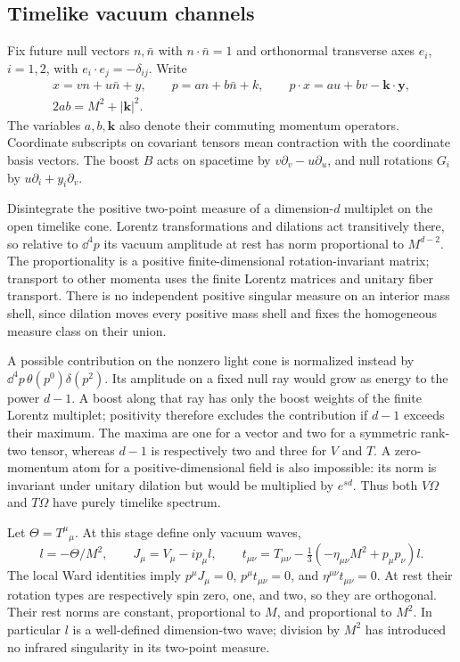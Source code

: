 \subsection{Timelike vacuum channels}
\label{F:waves}

Fix future null vectors $n,\bar n$ with $n\cdot\bar n=1$ and orthonormal
transverse axes $e_i$, $i=1,2$, with $e_i\cdot e_j=-\delta_{ij}$. Write
\begin{equation}\label{F:null-coordinates}
 \begin{gathered}
 x=vn+u\bar n+y,\qquad p=an+b\bar n+k,\qquad
 p\cdot x=au+bv-\boldsymbol k\cdot\boldsymbol y,\\
 2ab=M^2+|\boldsymbol k|^2.
 \end{gathered}
\end{equation}
The variables $a,b,\boldsymbol k$ also denote their commuting momentum
operators. Coordinate subscripts on covariant tensors mean contraction
with the coordinate basis vectors. The boost $B$ acts on spacetime by
$v\partial_v-u\partial_u$, and null rotations $G_i$ by
$u\partial_i+y_i\partial_v$.

Disintegrate the positive two-point measure of a dimension-$d$ multiplet
on the open timelike cone. Lorentz transformations and dilations act
transitively there, so relative to $\dd^4p$ its vacuum amplitude at rest
has norm proportional to $M^{d-2}$. The proportionality is a positive
finite-dimensional rotation-invariant matrix; transport to other
momenta uses the finite Lorentz matrices and unitary fiber transport.
There is no independent positive singular measure on an interior mass
shell, since dilation moves every positive mass shell and fixes the
homogeneous measure class on their union.

A possible contribution on the nonzero light cone is normalized instead
by $\dd^4p\,\theta(p^0)\delta(p^2)$. Its amplitude on a fixed null ray
would grow as energy to the power $d-1$. A boost along that ray has only
the boost weights of the finite Lorentz multiplet; positivity therefore
excludes the contribution if $d-1$ exceeds their maximum. The maxima
are one for a vector and two for a symmetric rank-two tensor, whereas
$d-1$ is respectively two and three for $V$ and $T$. A zero-momentum
atom for a positive-dimensional field is also impossible: its norm is
invariant under unitary dilation but would be multiplied by $e^{sd}$.
Thus both $V\Omega$ and $T\Omega$ have purely timelike spectrum.

Let $\Theta=T^\mu{}_{\mu}$. At this stage define only vacuum waves,
\begin{equation}\label{F:wave-decomposition}
 l=-\Theta/M^2,\qquad
 J_\mu=V_\mu-ip_\mu l,\qquad
 t_{\mu\nu}=T_{\mu\nu}
       -\tfrac13(-\eta_{\mu\nu}M^2+p_\mu p_\nu)l.
\end{equation}
The local Ward identities imply
$p^\mu J_\mu=0$, $p^\mu t_{\mu\nu}=0$, and
$\eta^{\mu\nu}t_{\mu\nu}=0$. At rest their rotation types are respectively
spin zero, one, and two, so they are orthogonal. Their rest norms are
constant, proportional to $M$, and proportional to $M^2$. In particular
$l$ is a well-defined dimension-two wave; division by $M^2$ has introduced
no infrared singularity in its two-point measure.

